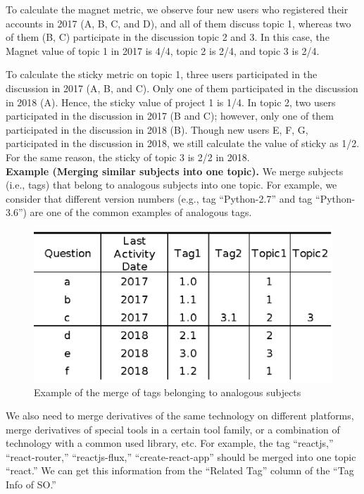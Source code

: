 \documentclass[english,preprint,JIP,technote]{ipsj}
\begin{document}
To calculate the magnet metric, we observe four new users who registered their accounts in 2017 (A, B, C, and D), and all of them discuss topic 1, whereas two of them (B, C) participate in the discussion topic 2 and 3. In this case, the Magnet value of topic 1 in 2017 is 4/4, topic 2 is 2/4, and topic 3 is 2/4.

To calculate the sticky metric on topic 1, three users participated in the discussion in 2017 (A, B, and C). Only one of them participated in the discussion in 2018 (A). Hence, the sticky value of project 1 is 1/4. In topic 2, two users participated in the discussion in 2017 (B and C); however, only one of them participated in the discussion in 2018 (B). Though new users E, F, G, participated in the discussion in 2018, we still calculate the value of sticky as 1/2. For the same reason, the sticky of topic 3 is 2/2 in 2018.\\

\noindent
\textbf{Example (Merging similar subjects into one topic).}
We merge subjects (i.e., tags) that belong to analogous subjects into one topic. For example, we consider that different version numbers (e.g., tag ``Python-2.7'' and tag ``Python-3.6'') are one of the common examples of analogous tags. 

\begin{figure}[t]
 \centering
 \includegraphics[width=0.80\hsize]{img/example001.eps}  
 \caption{Example of the merge of tags belonging to analogous subjects} 
 \label{fig:example1} 
\end{figure}


We also need to merge derivatives of the same technology on different platforms, merge derivatives of special tools in a certain tool family, or a combination of technology with a common used library, etc. For example, the tag ``reactjs,'' ``react-router,'' ``reactjs-flux,'' ``create-react-app'' should be merged into one topic ``react.''
We can get this information from the ``Related Tag'' column of the ``Tag Info of SO.''
\end{document}
